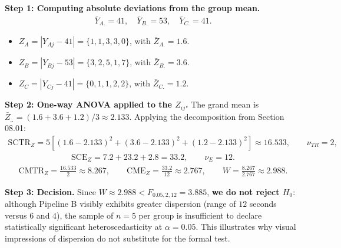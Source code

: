 \begin{solproblema}
	\textbf{Step 1: Computing absolute deviations from the group mean.}
	\begin{align}
		\bar{Y}_{A.} = 41, \quad \bar{Y}_{B.} = 53, \quad \bar{Y}_{C.} = 41.
	\end{align}
	\begin{itemize}
		\item $Z_{A} = |Y_{Aj} - 41| = \{1, 1, 3, 3, 0\}$, with $\bar{Z}_{A.} = 1.6$.
		\item $Z_{B} = |Y_{Bj} - 53| = \{3, 2, 5, 1, 7\}$, with $\bar{Z}_{B.} = 3.6$.
		\item $Z_{C} = |Y_{Cj} - 41| = \{0, 1, 1, 2, 2\}$, with $\bar{Z}_{C.} = 1.2$.
	\end{itemize}

	\textbf{Step 2: One-way ANOVA applied to the $Z_{ij}$.}
	The grand mean is $\bar{Z}_{..} = (1.6+3.6+1.2)/3 \approx 2.133$. Applying the decomposition from Section 08.01:
	\begin{align}
		\text{SCTR}_Z = 5\left[(1.6-2.133)^2+(3.6-2.133)^2+(1.2-2.133)^2\right] \approx 16.533, \qquad \nu_{TR}=2,
	\end{align}
	\begin{align}
		\text{SCE}_Z = 7.2 + 23.2 + 2.8 = 33.2, \qquad \nu_E = 12.
	\end{align}
	\begin{align}
		\text{CMTR}_Z = \frac{16.533}{2} \approx 8.267, \qquad \text{CME}_Z = \frac{33.2}{12} \approx 2.767, \qquad W = \frac{8.267}{2.767} \approx 2.988.
	\end{align}

	\textbf{Step 3: Decision.}
	Since $W \approx 2.988 < F_{0.05,2,12} = 3.885$, \textbf{we do not reject $H_0$}: although Pipeline B visibly exhibits greater dispersion (range of $12$ seconds versus $6$ and $4$), the sample of $n=5$ per group is insufficient to declare statistically significant heteroscedasticity at $\alpha=0.05$. This illustrates why visual impressions of dispersion do not substitute for the formal test.
\end{solproblema}

